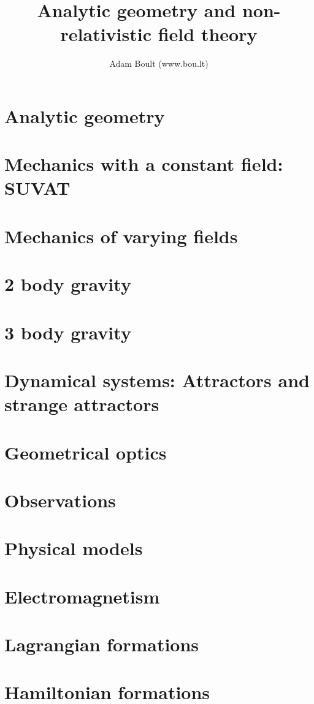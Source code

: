\documentclass[oneside]{book}
\begin{document}
\author{Adam Boult (www.bou.lt)}
\title{Analytic geometry and non-relativistic field theory}
\maketitle

\setcounter{tocdepth}{0}
\tableofcontents



\part{Analytic geometry}







\part{Mechanics with a constant field: SUVAT}


\part{Mechanics of varying fields}




\part{2 body gravity}

\part{3 body gravity}

\part{Dynamical systems: Attractors and strange attractors}

\part{Geometrical optics}

\part{Observations}

\part{Physical models}






\part{Electromagnetism}


\part{Lagrangian formations}

\part{Hamiltonian formations}

\end{document}
